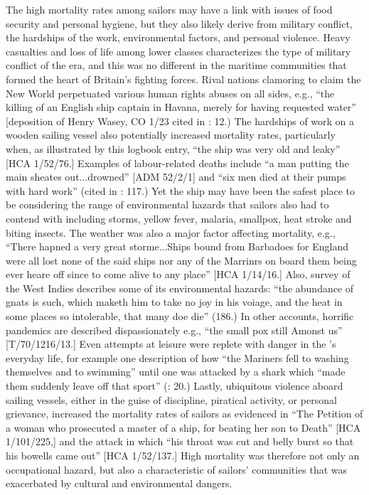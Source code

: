 The high mortality rates among sailors may have a link with issues of food security and personal hygiene, but they also likely derive from military conflict, the hardships of the work, environmental factors, and personal violence. Heavy casualties and loss of life among lower classes characterizes the type of military conflict of the era, and this was no different in the maritime communities that formed the heart of Britain’s fighting forces. Rival nations clamoring to claim the New World perpetuated various human rights abuses on all sides, e.g., “the killing of an English ship captain in Havana, merely for having requested water” [deposition of Henry Wasey, CO 1/23 cited in \citealt{Hatfield2016}: 12.) The hardships of work on a wooden sailing vessel also potentially increased mortality rates, particularly when, as illustrated by this logbook entry, “the ship was very old and leaky” [HCA 1/52/76.] Examples of labour-related deaths include “a man putting the main sheates out...drowned” [ADM 52/2/1] and “six men died at their pumps with hard work” (cited in \citealt{AdkinsAdkins2008}: 117.) Yet the ship may have been the safest place to be considering the range of environmental hazards that sailors also had to contend with including storms, yellow fever, malaria, smallpox, heat stroke and biting insects. The weather was also a major factor affecting mortality, e.g., “There hapned a very great storme...Ships bound from Barbadoes for England were all lost none of the said ships nor any of the Marrinrs on board them being ever heare off since to come alive to any place” [HCA 1/14/16.] Also,  survey of the West Indies describes some of its environmental hazards: “the abundance of gnats is such, which maketh him to take no joy in his voiage, and the heat in some places so intolerable, that many doe die” (186.) In other accounts, horrific pandemics are described dispassionately e.g., “the small pox still Amonst us” [T/70/1216/13.] Even attempts at leisure were replete with danger in the ’s everyday life, for example one description of how “the Mariners fell to washing themselves and to swimming” until one was attacked by a shark which “made them suddenly leave off that sport” (\citealt{Gage1648}: 20.) Lastly, ubiquitous violence aboard sailing vessels, either in the guise of discipline, piratical activity, or personal grievance, increased the mortality rates of sailors as evidenced in “The Petition of a woman who prosecuted a master of a ship, for beating her son to Death” [HCA 1/101/225,] and the  attack in which “his throat was cut and belly burst so that his bowells came out” [HCA 1/52/137.] High mortality was therefore not only an occupational hazard, but also a characteristic of sailors’ communities that was exacerbated by cultural and environmental dangers. 

